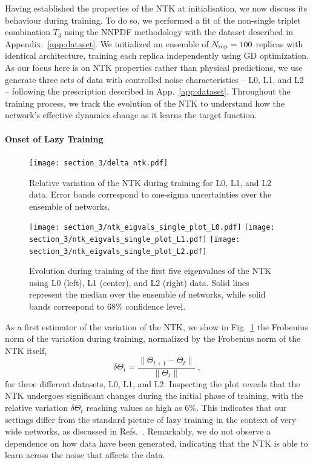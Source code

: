 Having established the properties of the NTK at initialisation, we now discuss
its behaviour during training. To do so, we performed a fit of the non-single
triplet combination $T_3$ using the NNPDF methodology with the dataset described
in Appendix.~\ref{app:dataset}. We initialized an ensemble of $N_{\rm rep} = 100$
replicas with identical architecture, training each replica independently using
GD optimization. As our focus here is on NTK properties rather than physical
predictions, we use generate three sets of data with controlled noise
characteristics -- L0, L1, and L2 -- following the prescription described in
App.~\ref{app:dataset}. Throughout the training process, we track the evolution
of the NTK to understand how the network's effective dynamics change as it
learns the target function.

\paragraph{Onset of Lazy Training} 

\begin{figure}[t]
  \centering
  \texttt{[image: section\_3/delta\_ntk.pdf]}
  \caption{Relative variation of the NTK during training for L0, L1, and
  L2 data. Error bands correspond to one-sigma uncertainties over the ensemble
  of networks.}
  \label{fig:NTKTime}
\end{figure}

\begin{figure}[t]
  \centering
  \texttt{[image: section\_3/ntk\_eigvals\_single\_plot\_L0.pdf]}
  \texttt{[image: section\_3/ntk\_eigvals\_single\_plot\_L1.pdf]}
  \texttt{[image: section\_3/ntk\_eigvals\_single\_plot\_L2.pdf]} 
  \caption{Evolution during training of the first five eigenvalues of the NTK
  using L0 (left), L1 (center), and L2 (right) data. Solid lines represent the
  median over the ensemble of networks, while solid bands correspond to 68\%
  confidence level.}
  \label{fig:NTKEigvalsTime}
\end{figure}

As a first estimator of the variation of the NTK, we show in
Fig.~\ref{fig:NTKTime} the Frobenius norm of the variation during training,
normalized by the Frobenius norm of the NTK itself, 
\begin{equation}
\delta \Theta_t = \frac{\lVert \Theta_{t+1} - \Theta_t \rVert}{\lVert \Theta_t \rVert} \;,
\label{eq:DeltaNTK}
\end{equation}
for three different datasets, L0, L1, and L2. Inspecting the plot reveals that
the NTK undergoes significant changes during the initial phase of training, with
the relative variation $\delta \Theta_t$ reaching values as high as $6\%$. This
indicates that our settings differ from the standard picture of lazy training in
the context of very wide networks, as discussed in
Refs.~\cite{jacot2018neural,Roberts:2021fes,lee2019wide}. Remarkably, we do not
observe a dependence on how data have been generated, indicating that the NTK is
able to learn across the noise that affects the data. 

